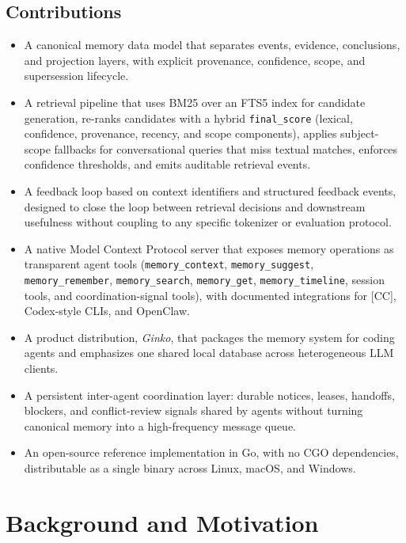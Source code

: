 \documentclass[11pt,a4paper]{article}
\begin{document}
\subsection{Contributions}

\begin{itemize}
 \item A canonical memory data model that separates events, evidence, conclusions, and projection layers, with explicit provenance, confidence, scope, and supersession lifecycle.
 \item A retrieval pipeline that uses BM25 over an FTS5 index for candidate generation, re-ranks candidates with a hybrid \texttt{final\_score} (lexical, confidence, provenance, recency, and scope components), applies subject-scope fallbacks for conversational queries that miss textual matches, enforces confidence thresholds, and emits auditable retrieval events.
 \item A feedback loop based on context identifiers and structured feedback events, designed to close the loop between retrieval decisions and downstream usefulness without coupling to any specific tokenizer or evaluation protocol.
 \item A native Model Context Protocol server that exposes memory operations as transparent agent tools (\texttt{memory\_context}, \texttt{memory\_suggest}, \texttt{memory\_remember}, \texttt{memory\_search}, \texttt{memory\_get}, \texttt{memory\_timeline}, session tools, and coordination-signal tools), with documented integrations for [CC], Codex-style CLIs, and OpenClaw.
 \item A product distribution, \textit{Ginko}, that packages the memory system for coding agents and emphasizes one shared local database across heterogeneous LLM clients.
 \item A persistent inter-agent coordination layer: durable notices, leases, handoffs, blockers, and conflict-review signals shared by agents without turning canonical memory into a high-frequency message queue.
 \item An open-source reference implementation in Go, with no CGO dependencies, distributable as a single binary across Linux, macOS, and Windows.
\end{itemize}

\section{Background and Motivation}
\end{document}
